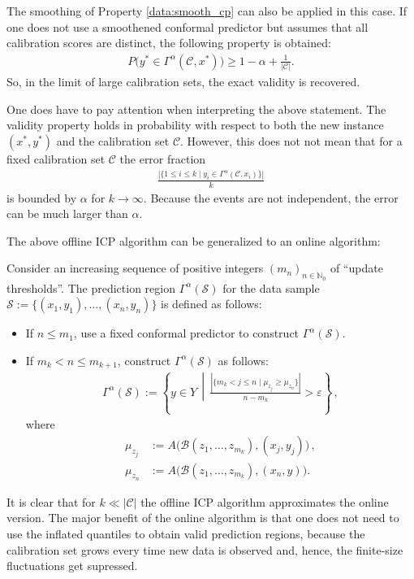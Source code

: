 \begin{property}[Validity]
        The smoothing of Property \ref{data:smooth_cp} can also be applied in this case. If one does not use a smoothened conformal predictor but assumes that all calibration scores are distinct, the following property is obtained:
        \begin{gather}
            P\big(y^*\in\Gamma^\alpha(\mathcal{C},x^*)\big)\geq 1 - \alpha + \frac{1}{|\mathcal{C}|}.
        \end{gather}
        So, in the limit of large calibration sets, the exact validity is recovered.
    \end{property}
    \begin{remark}
        One does have to pay attention when interpreting the above statement. The validity property holds in probability with respect to both the new instance $(x^*,y^*)$ and the calibration set $\mathcal{C}$. However, this does not not mean that for a fixed calibration set $\mathcal{C}$ the error fraction
        \begin{gather}
            \frac{|\{1\leq i\leq k\mid y_i\in\Gamma^\alpha(\mathcal{C},x_i)\}|}{k}
        \end{gather}
        is bounded by $\alpha$ for $k\longrightarrow\infty$. Because the events are not independent, the error can be much larger than $\alpha$.
    \end{remark}

    The above offline ICP algorithm can be generalized to an online algorithm:
    \begin{construct}
        Consider an increasing sequence of positive integers $(m_n)_{n\in\mathbb{N}_0}$ of ``update thresholds''. The prediction region $\Gamma^\alpha(\mathcal{S})$ for the data sample $\mathcal{S}:=\{(x_1,y_1),\ldots,(x_n,y_n)\}$ is defined as follows:
        \begin{itemize}
            \item If $n\leq m_1$, use a fixed conformal predictor to construct $\Gamma^\alpha(\mathcal{S})$.
            \item If $m_k<n\leq m_{k+1}$, construct $\Gamma^\alpha(\mathcal{S})$ as follows:
            \begin{gather}
                \Gamma^\alpha(\mathcal{S}) := \left\{y\in Y\,\middle\vert\,\frac{|\{m_k<j\leq n\mid\mu_{z_j}\geq\mu_{z_n}\}|}{n-m_k}>\varepsilon\right\}\,,
            \end{gather}
            where
            \begin{align*}
                \mu_{z_j} &:= A\big(\mathcal{B}(z_1,\ldots,z_{m_k}),(x_j,y_j)\big)\,,\\
                \mu_{z_n} &:= A\big(\mathcal{B}(z_1,\ldots,z_{m_k}),(x_n,y)\big).
            \end{align*}
        \end{itemize}
        It is clear that for $k\ll|\mathcal{C}|$ the offline ICP algorithm approximates the online version. The major benefit of the online algorithm is that one does not need to use the inflated quantiles to obtain valid prediction regions, because the calibration set grows every time new data is observed and, hence, the finite-size fluctuations get supressed.
    \end{construct}

